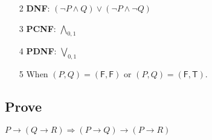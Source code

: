 \documentclass{article}
\begin{document}
\begin{itemize}
\begin{itemize}
        \item [2] \textbf{DNF}: $(\lnot P\wedge Q)\vee(\lnot P\wedge\lnot Q)$
        \item [3] \textbf{PCNF}: $\bigwedge_{0,1}$
        \item [4] \textbf{PDNF}: $\bigvee_{0,1}$
        \item [5] When $(P,Q)=(\mathsf{F},\mathsf{F})$ or $(P,Q)=(\mathsf{F},\mathsf{T})$.
    \end{itemize}
\end{itemize}

\subsection{Prove}

$P\rightarrow(Q\rightarrow R)\Rightarrow(P\rightarrow Q)\rightarrow(P\rightarrow R)$
\end{document}
